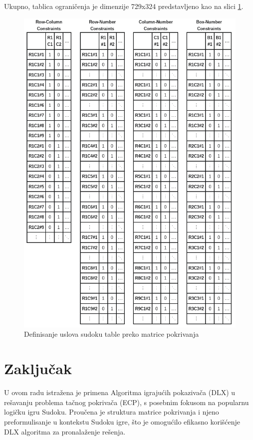 \documentclass[a4paper]{article}
\begin{document}
{Ukupno, tablica ograničenja je dimenzije 729x324 predstavljeno kao na slici \ref{fig:tabla}. 

\begin{figure}[h!]
  \begin{center}
  \includegraphics[scale=0.325]{slike/sudoku.png}
  \end{center}
  \caption{Definisanje uslova sudoku table preko matrice pokrivanja}
  \label{fig:tabla}
\end{figure}


\section{Zaključak}
\label{sec:zakljucak}

U ovom radu istražena je primena Algoritma igrajućih pokazivača (DLX) u rešavanju problema tačnog pokrivača (ECP), s posebnim fokusom
na popularnu logičku igru Sudoku. Proučena je struktura matrice pokrivanja i njeno preformulisanje u kontekstu Sudoku igre, što je
omogućilo efikasno korišćenje DLX algoritma za pronalaženje rešenja.

}
\end{document}
